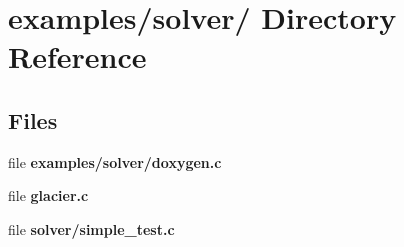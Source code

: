 \hypertarget{dir_000010}{
\section{examples/solver/ Directory Reference}
\label{dir_000010}
}
\subsection*{Files}
\begin{CompactItemize}
\item 
file {\bf examples/solver/doxygen.c}
\item 
file {\bf glacier.c}
\item 
file {\bf solver/simple\_\-test.c}
\end{CompactItemize}
